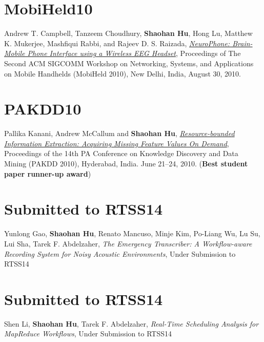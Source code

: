 \section{\sc MobiHeld10}\hypertarget{campbell2010mobiheld}{}
Andrew T. Campbell, Tanzeem Choudhury, \textbf{Shaohan Hu}, Hong Lu,
Matthew K. Mukerjee, Mashfiqui Rabbi, and Rajeev D. S. Raizada,
\href{http://portal.acm.org/citation.cfm?id=1851326}{\emph{NeuroPhone: Brain-Mobile Phone Interface using a Wireless EEG
  Headset}}, \textsf{Proceedings of The Second ACM SIGCOMM Workshop on
  Networking, Systems, and Applications on Mobile Handhelds (MobiHeld
  2010)}, New Delhi, India, August 30, 2010.

\section{\sc PAKDD10}\hypertarget{kanani2010pakdd}{}
Pallika Kanani, Andrew McCallum and \textbf{Shaohan Hu},
\href{http://www.springerlink.com/content/j41w758434321108}{\emph{Resource-bounded Information Extraction: Acquiring Missing
  Feature Values On Demand}}, \textsf{Proceedings of the 14th PA
  Conference on Knowledge Discovery and Data Mining (PAKDD 2010)},
Hyderabad, India. June 21--24, 2010. (\textbf{Best student paper runner-up award})




\section{\sc Submitted to RTSS14}\hypertarget{gao2014rtss}{}
Yunlong Gao, \textbf{Shaohan Hu}, Renato Mancuso, Minje Kim, Po-Liang Wu, Lu Su, Lui Sha, Tarek F. Abdelzaher, \emph{The Emergency Transcriber: A Workflow-aware Recording System for Noisy Acoustic Environments}, \textsf{Under Submission to RTSS14} %

\section{\sc Submitted to RTSS14}\hypertarget{li2014rtss}{}
Shen Li, \textbf{Shaohan Hu}, Tarek F. Abdelzaher, \emph{Real-Time Scheduling Analysis for MapReduce Workflows}, \textsf{Under Submission to RTSS14} %


